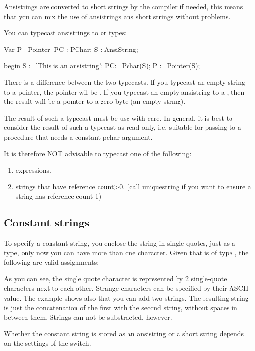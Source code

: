 \documentclass{report}
\begin{document}
Ansistrings are converted to short strings by the compiler if needed,
this means that you can mix the use of ansistrings ans short strings
without problems.

You can typecast ansistrings to  or  types:
\begin{listing}
Var P : Pointer;
    PC : PChar;
    S : AnsiString;

begin
  S :='This is an ansistring';
  PC:=Pchar(S);
  P :=Pointer(S);
\end{listing}
There is a difference between the two typecasts. If you typecast an empty
string to a pointer, the pointer wil be . If you typecast an empty
ansistring to a , then the result will be a pointer to a zero
byte (an empty string).
 
The result of such a typecast must be use with care. In general, it is best
to consider the result of such a typecast as read-only, i.e. suitable for
passing to a procedure that needs a constant pchar argument. 

It is therefore NOT advisable to typecast one of the following:
\begin{enumerate}
\item expressions.
\item strings that have reference count>0.  (call uniquestring if you want to
ensure a string has reference count 1)
\end{enumerate}
\subsection{Constant strings}
 
To specify a constant string, you enclose the string in single-quotes, just
as a  type, only now you can have more than one character.
Given that  is of type , the following are valid assignments: 
As you can see, the single quote character is represented by 2 single-quote
characters next to each other. Strange characters can be specified by their
ASCII value.
The example shows also that you can add two strings. The resulting string is
just the concatenation of the first with the second string, without spaces in
between them. Strings can not be substracted, however.

Whether the constant string is stored as an ansistring or a short string
depends on the settings of the  switch.
\end{document}
